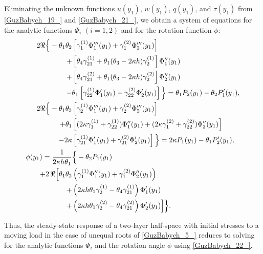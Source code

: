 Eliminating the unknown functions $u(y_1)$, $w(y_1)$, $q(y_1)$, and $\tau(y_1)$ from \eqref{GuzBabych_19_} and \eqref{GuzBabych_21_}, we obtain a system of equations for the analytic functions $\Phi_i$ $(i=1,2)$ and for the rotation function $\phi$:
\begin{align}
		\notag
       	2\Re \Big\{ -\theta_1 \theta_2& \left[ \gamma_1^{(1)} \Phi_1'''(y_1) + \gamma_1^{(2)} \Phi_2'''(y_1) \right]
        \\ \notag
        + &\left[ \theta_4 \gamma_{21}^{(1)} + \theta_1(\theta_3 - 2\kappa h)\gamma_2^{(1)} \right] \Phi_1''(y_1)  
        \\ \notag
        +&\left[ \theta_4 \gamma_{21}^{(2)} + \theta_1(\theta_3 - 2\kappa h)\gamma_2^{(2)} \right] \Phi_2''(y_1)
        \\ \notag
        - &\theta_1 \left[ \gamma_{22}^{(1)} \Phi_1'(y_1) + \gamma_{22}^{(2)} \Phi_2'(y_1) \right] \Big\}  
        = \theta_1 P_2(y_1) - \theta_2 P_1'(y_1), 
        \\ \notag
        2\Re \Big\{ -\theta_1 \theta_3 &\left[ \gamma_2^{(1)} \Phi_1'''(y_1) + \gamma_2^{(2)} \Phi_2'''(y_1) \right]
        \\ \notag
        + \theta_1& \left[ (2\kappa \gamma_1^{(1)} + \gamma_{22}^{(1)}) \Phi_1''(y_1) + (2\kappa \gamma_1^{(2)} + \gamma_{22}^{(2)}) \Phi_2''(y_1) \right]
          \\ \notag
         - 2\kappa &\left[ \gamma_{21}^{(1)} \Phi_1'(y_1) + \gamma_{21}^{(2)} \Phi_2'(y_1) \right] \Big\}
         = 2\kappa P_1(y_1) - \theta_1 P_2'(y_1), 
		\\ \notag
        \phi(y_1) = \frac{1}{2\kappa h \theta_1} &\Big\{ -\theta_2 P_1(y_1)
        \\ \notag
        + 2\,\Re \Big[ \theta_1 \theta_2 &\left( \gamma_1^{(1)} \Phi_1''(y_1) + \gamma_1^{(2)} \Phi_2''(y_1) \right) 
         \\ \notag
        + & \left( 2\kappa h \theta_1 \gamma_2^{(1)} - \theta_4 \gamma_{21}^{(1)} \right) \Phi_1'(y_1)
        \\ \label{GuzBabych_22_}
        + &\left( 2\kappa h \theta_1 \gamma_2^{(2)} - \theta_4 \gamma_{21}^{(2)} \right) \Phi_2'(y_1) \Big] \Big\}.
\end{align}


Thus, the steady-state response of a two-layer half-space with initial stresses to a moving load in the case of unequal roots of \eqref{GuzBabych_5_} reduces to solving for the analytic functions $\Phi_i$ and the rotation angle $\phi$ using \eqref{GuzBabych_22_}.

